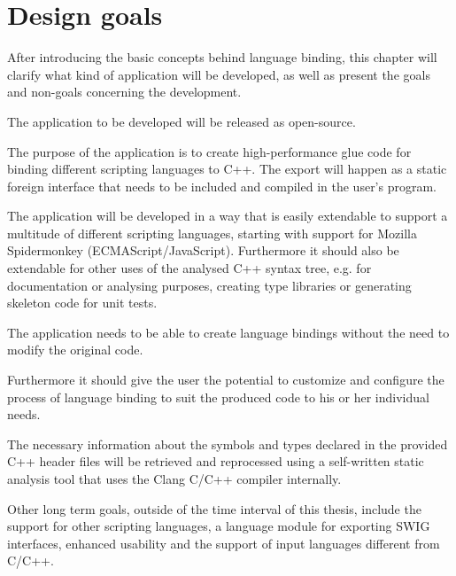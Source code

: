 \chapter{Design goals}
\label{chap:DesignGoals}

After introducing the basic concepts behind language binding, this chapter will clarify what kind of application will be developed, as well as present the goals and non-goals concerning the development.

The application to be developed will be released as open-source.

The purpose of the application is to create high-performance glue code for binding different scripting languages to C++. The export will happen as a static foreign interface that needs to be included and compiled in the user's program.

The application will be developed in a way that is easily extendable to support a multitude of different scripting languages, starting with support for Mozilla Spidermonkey (ECMAScript/JavaScript). Furthermore it should also be extendable for other uses of the analysed C++ syntax tree, e.g. for documentation or analysing purposes, creating type libraries or generating skeleton code for unit tests.

The application needs to be able to create language bindings without the need to modify the original code.

Furthermore it should give the user the potential to customize and configure the process of language binding to suit the produced code to his or her individual needs.

The necessary information about the symbols and types declared in the provided C++ header files will be retrieved and reprocessed using a self-written static analysis tool that uses the Clang C/C++ compiler internally.

Other long term goals, outside of the time interval of this thesis, include the support for other scripting languages, a language module for exporting SWIG interfaces, enhanced usability and the support of input languages different from C/C++.